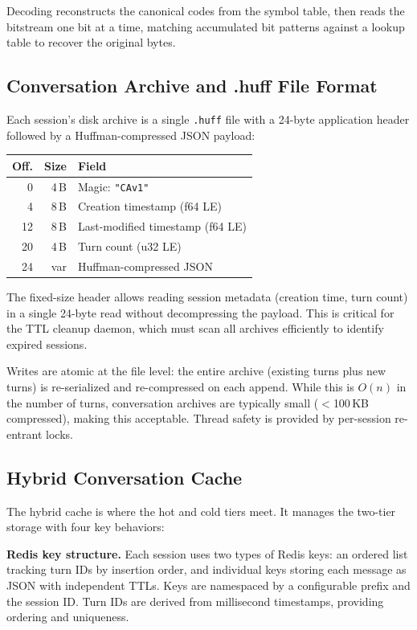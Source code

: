 \documentclass[conference]{IEEEtran}
\begin{document}
Decoding reconstructs the canonical codes from the symbol table, then reads the bitstream one bit at a time, matching accumulated bit patterns against a lookup table to recover the original bytes.

\subsection{Conversation Archive and .huff File Format}

Each session's disk archive is a single \texttt{.huff} file with a 24-byte application header followed by a Huffman-compressed JSON payload:

\begin{center}
{\scriptsize
\begin{tabular}{@{}rrl@{}}
\toprule
\textbf{Off.} & \textbf{Size} & \textbf{Field} \\
\midrule
0 & 4\,B & Magic: \texttt{"CAv1"} \\
4 & 8\,B & Creation timestamp (f64 LE) \\
12 & 8\,B & Last-modified timestamp (f64 LE) \\
20 & 4\,B & Turn count (u32 LE) \\
24 & var & Huffman-compressed JSON \\
\bottomrule
\end{tabular}}
\end{center}

The fixed-size header allows reading session metadata (creation time, turn count) in a single 24-byte read without decompressing the payload. This is critical for the TTL cleanup daemon, which must scan all archives efficiently to identify expired sessions.

Writes are atomic at the file level: the entire archive (existing turns plus new turns) is re-serialized and re-compressed on each append. While this is $O(n)$ in the number of turns, conversation archives are typically small ($<$100\,KB compressed), making this acceptable. Thread safety is provided by per-session re-entrant locks.

\subsection{Hybrid Conversation Cache}

The hybrid cache is where the hot and cold tiers meet. It manages the two-tier storage with four key behaviors:

\textbf{Redis key structure.} Each session uses two types of Redis keys: an ordered list tracking turn IDs by insertion order, and individual keys storing each message as JSON with independent TTLs. Keys are namespaced by a configurable prefix and the session ID. Turn IDs are derived from millisecond timestamps, providing ordering and uniqueness.
\end{document}
